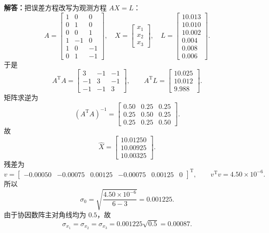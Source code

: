 \documentclass[UTF8,zihao=-4]{ctexart}
\newcommand{\jieda}{\noindent\textbf{解答：}}
\begin{document}
{\jieda 把误差方程改写为观测方程 $AX=L$：
\begin{equation*}
    A=\begin{bmatrix}
        1&0&0\\0&1&0\\0&0&1\\1&-1&0\\1&0&-1\\0&1&-1
    \end{bmatrix},\quad
    X=\begin{bmatrix}x_1\\x_2\\x_3\end{bmatrix},\quad
    L=\begin{bmatrix}10.013\\10.010\\10.002\\0.004\\0.008\\0.006\end{bmatrix}.
\end{equation*}
于是
\begin{equation*}
    A^{\mathrm T}A=\begin{bmatrix}
        3&-1&-1\\-1&3&-1\\-1&-1&3
    \end{bmatrix},
    \qquad
    A^{\mathrm T}L=\begin{bmatrix}10.025\\10.012\\9.988\end{bmatrix}.
\end{equation*}
矩阵求逆为
\begin{equation*}
    (A^{\mathrm T}A)^{-1}=\begin{bmatrix}
        0.50&0.25&0.25\\
        0.25&0.50&0.25\\
        0.25&0.25&0.50
    \end{bmatrix}.
\end{equation*}
故
\begin{equation*}
    \hat{X}=\begin{bmatrix}
        10.01250\\10.00925\\10.00325
    \end{bmatrix}.
\end{equation*}
残差为
\begin{equation*}
    v=\begin{bmatrix}-0.00050&-0.00075&0.00125&-0.00075&0.00125&0\end{bmatrix}^{\mathrm T},
    \qquad
    v^{\mathrm T}v=4.50\times10^{-6}.
\end{equation*}
所以
\begin{equation*}
    \sigma_0=\sqrt{\frac{4.50\times10^{-6}}{6-3}}=0.001225.
\end{equation*}
由于协因数阵主对角线均为 $0.5$，故
\begin{equation*}
    \sigma_{x_1}=\sigma_{x_2}=\sigma_{x_3}
    =0.001225\sqrt{0.5}=0.00087.
\end{equation*}

}
\end{document}
